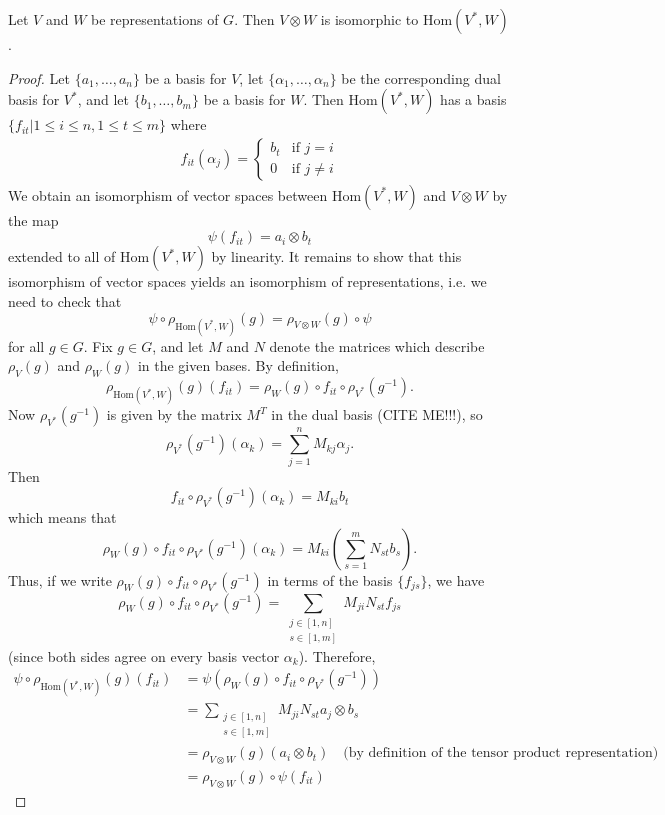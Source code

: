 \begin{prop}
Let $V$ and $W$ be representations of $G$.  Then $V \otimes W$ is isomorphic to $\text{Hom}(V^{*},W)$.
\end{prop}
\begin{proof}
Let $\{ a_1,  \ldots, a_n\}$ be a basis for $V$, let $\{\alpha_1, \ldots, \alpha_n \}$ be the corresponding dual basis for $V^{*}$, and let $\{b_1,  \ldots,b_m\}$ be a basis for $W$.  Then $\text{Hom}(V^*,W)$ has a basis $\{ f_{it} | 1 \leq i \leq n, 1 \leq t \leq m \}$ where
\begin{align*}
f_{it} (\alpha_j) = \begin{cases} b_t &\text{if } j = i\\ 0 &\text{if } j \neq i \end{cases}
\end{align*}
We obtain an isomorphism of vector spaces between $\text{Hom}(V^*,W)$ and $V \otimes W$ by the map
\[ \psi (f_{it}) = a_i \otimes b_t \]
extended to all of  $\text{Hom}(V^*,W)$ by linearity.  It remains to show that this isomorphism of vector spaces yields an isomorphism of representations, i.e. we need to check that 
\[ \psi \circ \rho_{\text{Hom}(V^*,W)} (g) = \rho_{V \otimes W} (g) \circ \psi \]
for all $g \in G$.  Fix $g \in G$, and let $M$ and $N$ denote the matrices which describe $\rho_V (g)$ and $\rho_W (g)$ in the given bases.  
By definition,
\[ \rho_{\text{Hom}(V^{*},W)} (g) (f_{it}) = \rho_W (g) \circ f_{it} \circ \rho_{V^{*}}(g^{-1}). \]
Now $\rho_{V^{*}} (g^ {-1})$ is given by the matrix $M^T$ in the dual basis (CITE ME!!!), so
\[\rho_{V^{*}} (g^ {-1}) ( \alpha_k )= \sum_{j=1}^n M_{kj} \alpha_{j}. \]
Then
\[ f_{it} \circ \rho_{V^{*}} (g^ {-1}) (\alpha_k) = M_{ki} b_t \]
which means that 
\[ \rho_W (g) \circ f_{it} \circ \rho_{V^{*}} (g^ {-1}) ( \alpha_k) = M_{ki} \left( \sum_{s=1}^m N_{st} b_s \right). \]
Thus, if we write $\rho_W (g) \circ f_{it} \circ \rho_{V^{*}} (g^ {-1})$ in terms of the basis $\{ f_{js} \}$, we have 
\[\rho_W (g) \circ f_{it} \circ \rho_{V^{*}} (g^ {-1}) = \sum_{\substack{j \in [1,n] \\  s \in [1,m]}} M_{ji} N_{st} f_{js} \]
(since both sides agree on every basis vector $\alpha_k$).  Therefore,
\begin{align*}
\psi \circ \rho_{\text{Hom}(V^*,W)} (g) (f_{it}) &= \psi \left(\rho_W (g) \circ f_{it} \circ \rho_{V^{*}} (g^ {-1}) \right) \\
&=  \sum_{\substack{j \in [1,n] \\  s \in [1,m]}} M_{ji} N_{st} a_j \otimes b_s \\
&= \rho_{V \otimes W} (g) (a_i \otimes b_t) \quad \text{(by definition of the tensor product representation)} \\
&= \rho_{V \otimes W} (g) \circ \psi (f_{it})
\end{align*}
\end{proof}


